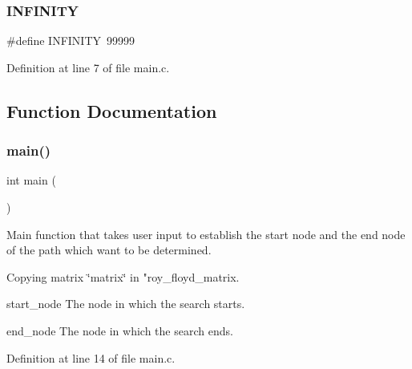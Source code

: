 \subsubsection{I\+N\+F\+I\+N\+I\+TY}
{\footnotesize\ttfamily \#define I\+N\+F\+I\+N\+I\+TY~99999}



Definition at line 7 of file main.\+c.



\subsection{Function Documentation}
\mbox{\label{main_8c_ae66f6b31b5ad750f1fe042a706a4e3d4}} 
\subsubsection{main()}
{\footnotesize\ttfamily int main (\begin{DoxyParamCaption}{ }\end{DoxyParamCaption})}

Main function that takes user input to establish the start node and the end node of the path which want to be determined.

Copying matrix \char`\"{}matrix\char`\"{} in "roy\+\_\+floyd\+\_\+matrix.

start\+\_\+node The node in which the search starts.

end\+\_\+node The node in which the search ends. 

Definition at line 14 of file main.\+c.

